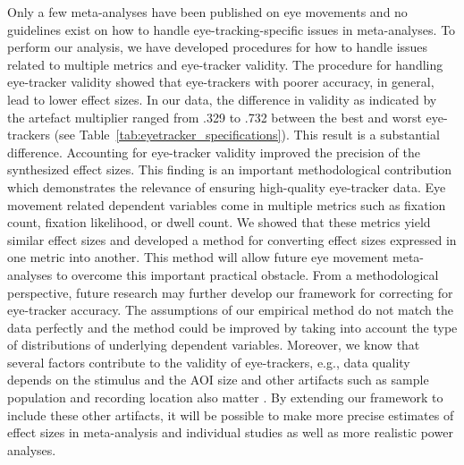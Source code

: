 \documentclass[english,natbib,man,floatsintext]{apa6}
\begin{document}
Only a few meta-analyses have been published on eye movements and no guidelines exist on how to handle eye-tracking-specific issues in meta-analyses. To perform our analysis, we have developed procedures for how to handle issues related to multiple metrics and eye-tracker validity. The procedure for handling eye-tracker validity showed that eye-trackers with poorer accuracy, in general, lead to lower effect sizes. In our data, the difference in validity as indicated by the artefact multiplier ranged from .329 to .732 between the best and worst eye-trackers (see Table~\ref{tab:eyetracker_specifications}). This result is a substantial difference. Accounting for eye-tracker validity improved the precision of the synthesized effect sizes. This finding is an important methodological contribution which demonstrates the relevance of ensuring high-quality eye-tracker data. Eye movement related dependent variables come in multiple metrics such as fixation count, fixation likelihood, or dwell count. We showed that these metrics yield similar effect sizes and developed a method for converting effect sizes expressed in one metric into another. This method will allow future eye movement meta-analyses to overcome this important practical obstacle. From a methodological perspective, future research may further develop our framework for correcting for eye-tracker accuracy. The assumptions of our empirical method do not match the data perfectly and the method could be improved by taking into account the type of distributions of underlying dependent variables. Moreover, we know that several factors contribute to the validity of eye-trackers, e.g., data quality depends on the stimulus and the AOI size \citep{orquin2018a} and other artifacts such as sample population and recording location also matter \citep{nystroem2013a}. By extending our framework to include these other artifacts, it will be possible to make more precise estimates of effect sizes in meta-analysis and individual studies as well as more realistic power analyses.\\   
\end{document}
